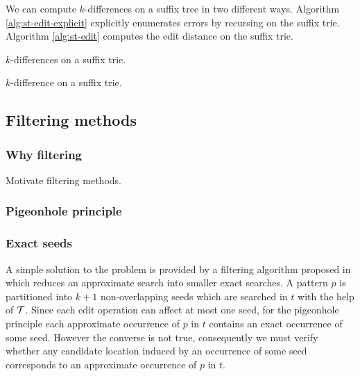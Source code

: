 We can compute $k$-differences on a suffix tree in two different ways. Algorithm \ref{alg:st-edit-explicit} explicitly enumerates errors by recursing on the suffix trie. Algorithm \ref{alg:st-edit} computes the edit distance on the suffix trie.

\begin{algorithm}[h]
\caption{$k$-differences on a suffix trie.}
\label{alg:st-edit-explicit}
\begin{algorithmic}[1]
		\State {}
	\Else 
		\State {}
		\ForAll {$\Cn \in \Ci(\Tn)$}
			\State {}
				\State {}
			\Else
				\State {}
			\EndIf
		\EndFor
	\EndIf
\EndProcedure
\end{algorithmic}
\end{algorithm}

\begin{algorithm}[h]
\caption{$k$-difference on a suffix trie.}
\label{alg:st-edit}
\begin{algorithmic}[1]
		\ForAll {$\Cn \in \Ci(\Tn)$}
			\State {}
		\EndFor
\EndProcedure
\end{algorithmic}
\end{algorithm}


\subsection{Filtering methods}

\subsubsection{Why filtering}

Motivate filtering methods.

\subsubsection{Pigeonhole principle}

\subsubsection{Exact seeds}
A simple solution to the problem is provided by a filtering algorithm proposed in \cite{Baeza1999b} which reduces an approximate search into smaller exact searches.
A pattern $p$ is partitioned into $k+1$ non-overlapping seeds which are searched in $t$ with the help of $\mathcal {T}$.
Since each edit operation can affect at most one seed, for the pigeonhole principle each approximate occurrence of $p$ in $t$ contains an exact occurrence of some seed.
However the converse is not true, consequently we must verify whether any candidate location induced by an occurrence of some seed corresponds to an approximate occurrence of $p$ in $t$.

